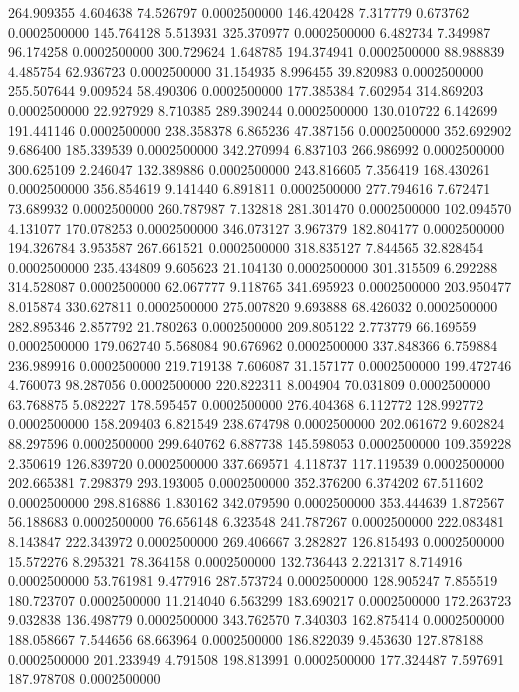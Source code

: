 264.909355 4.604638 74.526797 0.0002500000
146.420428 7.317779 0.673762 0.0002500000
145.764128 5.513931 325.370977 0.0002500000
6.482734 7.349987 96.174258 0.0002500000
300.729624 1.648785 194.374941 0.0002500000
88.988839 4.485754 62.936723 0.0002500000
31.154935 8.996455 39.820983 0.0002500000
255.507644 9.009524 58.490306 0.0002500000
177.385384 7.602954 314.869203 0.0002500000
22.927929 8.710385 289.390244 0.0002500000
130.010722 6.142699 191.441146 0.0002500000
238.358378 6.865236 47.387156 0.0002500000
352.692902 9.686400 185.339539 0.0002500000
342.270994 6.837103 266.986992 0.0002500000
300.625109 2.246047 132.389886 0.0002500000
243.816605 7.356419 168.430261 0.0002500000
356.854619 9.141440 6.891811 0.0002500000
277.794616 7.672471 73.689932 0.0002500000
260.787987 7.132818 281.301470 0.0002500000
102.094570 4.131077 170.078253 0.0002500000
346.073127 3.967379 182.804177 0.0002500000
194.326784 3.953587 267.661521 0.0002500000
318.835127 7.844565 32.828454 0.0002500000
235.434809 9.605623 21.104130 0.0002500000
301.315509 6.292288 314.528087 0.0002500000
62.067777 9.118765 341.695923 0.0002500000
203.950477 8.015874 330.627811 0.0002500000
275.007820 9.693888 68.426032 0.0002500000
282.895346 2.857792 21.780263 0.0002500000
209.805122 2.773779 66.169559 0.0002500000
179.062740 5.568084 90.676962 0.0002500000
337.848366 6.759884 236.989916 0.0002500000
219.719138 7.606087 31.157177 0.0002500000
199.472746 4.760073 98.287056 0.0002500000
220.822311 8.004904 70.031809 0.0002500000
63.768875 5.082227 178.595457 0.0002500000
276.404368 6.112772 128.992772 0.0002500000
158.209403 6.821549 238.674798 0.0002500000
202.061672 9.602824 88.297596 0.0002500000
299.640762 6.887738 145.598053 0.0002500000
109.359228 2.350619 126.839720 0.0002500000
337.669571 4.118737 117.119539 0.0002500000
202.665381 7.298379 293.193005 0.0002500000
352.376200 6.374202 67.511602 0.0002500000
298.816886 1.830162 342.079590 0.0002500000
353.444639 1.872567 56.188683 0.0002500000
76.656148 6.323548 241.787267 0.0002500000
222.083481 8.143847 222.343972 0.0002500000
269.406667 3.282827 126.815493 0.0002500000
15.572276 8.295321 78.364158 0.0002500000
132.736443 2.221317 8.714916 0.0002500000
53.761981 9.477916 287.573724 0.0002500000
128.905247 7.855519 180.723707 0.0002500000
11.214040 6.563299 183.690217 0.0002500000
172.263723 9.032838 136.498779 0.0002500000
343.762570 7.340303 162.875414 0.0002500000
188.058667 7.544656 68.663964 0.0002500000
186.822039 9.453630 127.878188 0.0002500000
201.233949 4.791508 198.813991 0.0002500000
177.324487 7.597691 187.978708 0.0002500000
